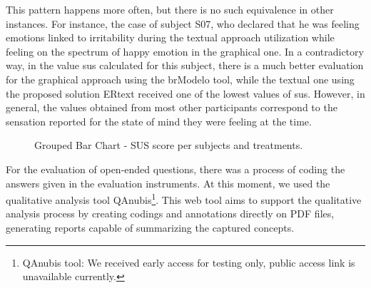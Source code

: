 This pattern happens more often, but there is no such equivalence in other instances.
For instance, the case of subject S07, who declared that he was feeling emotions linked to irritability during the textual approach utilization while feeling on the spectrum of happy emotion in the graphical one.
In a contradictory way, in the value \ac{sus} calculated for this subject, there is a much better evaluation for the graphical approach using the brModelo tool, while the textual one using the proposed solution ERtext received one of the lowest values of \ac{sus}.
However, in general, the values obtained from most other participants correspond to the sensation reported for the state of mind they were feeling at the time.

\begin{figure}[!htb]
    \centering
    \caption{Grouped Bar Chart - SUS score per subjects and treatments.}
    \label{fig:GroupedBarSUS_tools}
    
\end{figure}

For the evaluation of open-ended questions, there was a process of coding the answers given in the evaluation instruments.
At this moment, we used the qualitative analysis tool QAnubis\footnote{QAnubis tool: We received early access for testing only, public access link is unavailable currently.}.
This web tool aims to support the qualitative analysis process by creating codings and annotations directly on PDF files, generating reports capable of summarizing the captured concepts.


